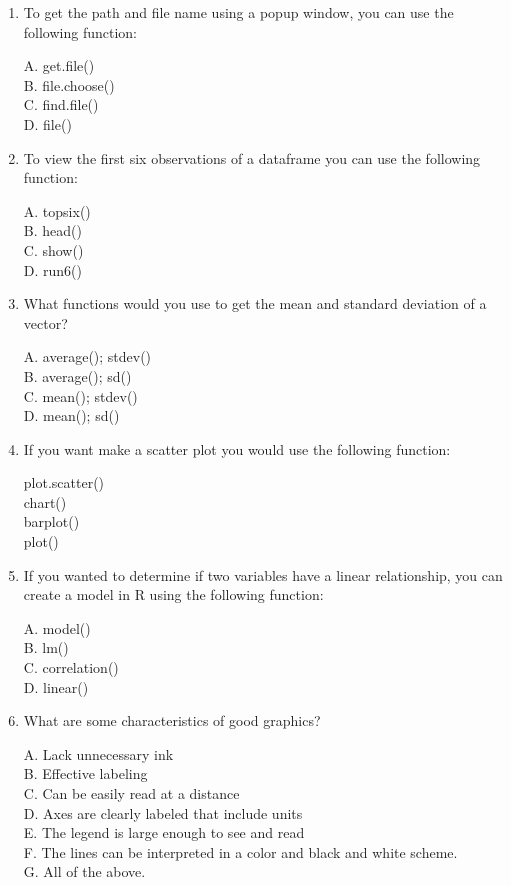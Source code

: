 \documentclass[12pt]{article}\usepackage[]{graphicx}\usepackage[]{color}
\begin{document}
\begin{enumerate}
\item To get the path and file name using a popup window, you can use the following function:

A. get.file() \\
B. file.choose() \\
C. find.file() \\
D. file() 

\item To view the first six observations of a dataframe you can use the following function:

A. topsix() \\
B. head() \\
C. show() \\
D. run6() 

\item What functions would you use to get the mean and standard deviation of a vector?

A. average(); stdev() \\
B. average(); sd() \\
C. mean(); stdev() \\
D. mean(); sd() 

\item If you want make a scatter plot you would use the following function:

plot.scatter() \\
chart() \\
barplot() \\
plot() 

\item If you wanted to determine if two variables have a linear relationship, you can create a model in R using the following function:

A. model() \\
B. lm() \\
C. correlation() \\
D. linear()

\item What are some characteristics of good graphics?

A. Lack unnecessary ink \\
B. Effective labeling \\
C. Can be easily read at a distance \\
D. Axes are clearly labeled that include units\\
E. The legend is large enough to see and read\\
F. The lines can be interpreted in a color and black and white scheme. \\
G. All of the above. 



\end{enumerate}
\end{document}
